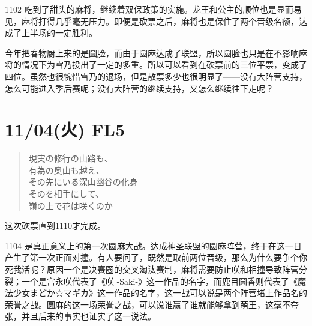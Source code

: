 1102 吃到了甜头的麻将，继续着双保政策的实施。龙王和公主的顺位也是显而易见，麻将打得几乎毫无压力。即便是砍票之后，麻将也是保住了两个晋级名额，达成了上半场的一定胜利。

今年把春物厨上来的是圆脸，而由于圆麻达成了联盟，所以圆脸也只是在不影响麻将的情况下为雪乃投出了一定的多重。所以可以看到在砍票前的三位平票，变成了四位。虽然也很惋惜雪乃的退场，但是散票多少也很明显了——没有大阵营支持，怎么可能进入季后赛呢；没有大阵营的继续支持，又怎么继续往下走呢？

\section{11/04(火) FL5}

\begin{quote}\ttfamily
現実の修行の山路も、                                      \\
有為の奥山も越え、                                        \\
その先にいる深山幽谷の化身——                            \\
そのを相手にして、 \\
嶺の上で花は咲くのか
\end{quote}


这次砍票直到1110才完成。

1104 是真正意义上的第一次圆麻大战。达成神圣联盟的圆麻阵营，终于在这一日产生了第一次正面对撞。有人要问了，既然是取前两位晋级，那么为什么要争个你死我活呢？原因一个是决赛圈的交叉淘汰赛制，麻将需要防止咲和相撞导致阵营分裂；一个是宫永咲代表了《咲 -Saki-》这一作品的名字，而鹿目圆香则代表了《魔法少女まどか☆マギカ》这一作品的名字，这一战可以说是两个阵营堵上作品名的荣誉之战。圆麻的这一场荣誉之战，可以说谁赢了谁就能够拿到萌王，这毫不夸张，并且后来的事实也证实了这一说法。

